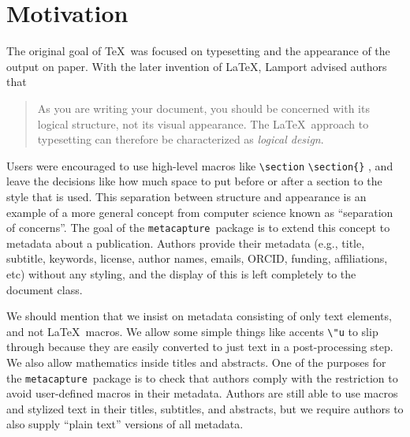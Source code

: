 \documentclass{article}
\newcommand{\pkgname}{\texttt{metacapture}}
\newcommand{\cmd}[2][]{%
  \def\FirstArg{#1}%
  \ifx\FirstArg\empty%
    \texttt{\textbackslash{}#2}%
  \else%
    \texttt{\textbackslash{}#2\{#1\}}%
  \fi
}
\begin{document}

\section{Motivation}
The original goal of \TeX\ was focused on typesetting and
the appearance of the output on paper. With the later invention of
\LaTeX, Lamport advised authors that
\begin{quote}As you are writing your document, you should be concerned with its logical
structure, not its visual appearance. The \LaTeX\ approach to typesetting
can therefore be characterized as \emph{logical design}.~\cite[\S 1.4]{latex}
\end{quote}
Users were encouraged to use high-level macros like \cmd{section}, and
leave the decisions like how much space to put before or after a
section to the style that is used.  This separation between structure
and appearance is an example of a more general concept from computer
science known as ``separation of concerns''. The goal of the \pkgname\
package is to extend this concept to metadata about a publication.
Authors provide their metadata (e.g., title, subtitle, keywords,
license, author names, emails, ORCID, funding, affiliations, etc)
without any styling, and the display of this is left completely to the
document class.

We should mention that we insist on metadata consisting of only text
elements, and not \LaTeX\ macros. We allow some simple things like
accents \verb+\"u+ to slip through because they are easily converted
to just text in a post-processing step. We also allow mathematics
inside titles and abstracts. One of the purposes for the \pkgname\
package is to check that authors comply with the restriction to avoid
user-defined macros in their metadata. Authors are still able to use macros and
stylized text in their titles, subtitles, and abstracts, but we
require authors to also supply ``plain text'' versions of all
metadata.
\end{document}
